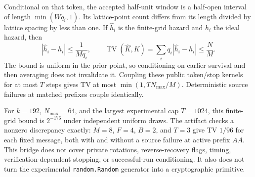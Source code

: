 Conditional on that token, the accepted half-unit window is a half-open
interval of length $\min(Wq_i,1)$. Its lattice-point count differs from its
length divided by lattice spacing by less than one. If $\widehat h_i$ is the
finite-grid hazard and $h_i$ the ideal hazard, then
\[
 |\widehat h_i-h_i|\le\frac{1}{Mq_i},\qquad
 \operatorname{TV}(\widehat K,K)
 =\sum_iq_i|\widehat h_i-h_i|\le\frac{N}{M}.
\]
The bound is uniform in the prior point, so conditioning on earlier survival
and then averaging does not invalidate it. Coupling these public token/stop
kernels for at most $T$ steps gives TV at most $\min(1,TN_{\max}/M)$.
Deterministic source failures at matched prefixes couple identically.

For $k=192$, $N_{\max}=64$, and the largest experimental cap $T=1024$, this
finite-grid bound is $2^{-176}$ under independent uniform draws. The artifact
checks a nonzero discrepancy exactly: $M=8$, $F=4$, $B=2$, and $T=3$ give TV
$1/96$ for each fixed message, both with and without a source failure at active
prefix $AA$. This bridge does not cover private rotations, reverse-recovery
flags, timing, verification-dependent stopping, or successful-run conditioning.
It also does not turn the experimental \texttt{random.Random} generator into a
cryptographic primitive.
